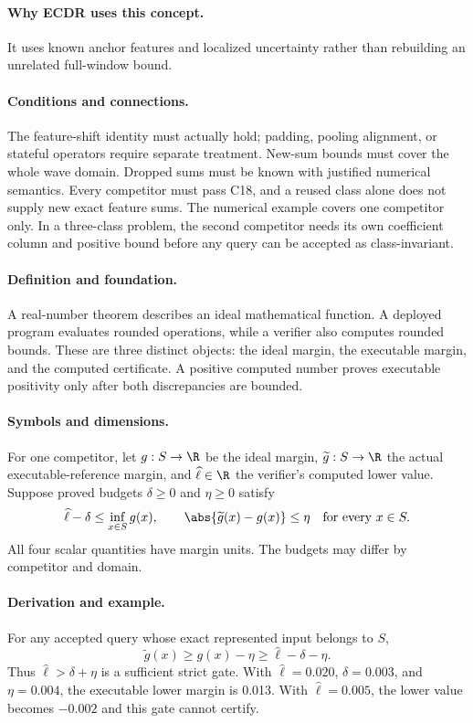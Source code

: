 \paragraph{Why ECDR uses this concept.}
It uses known anchor features and localized uncertainty rather than rebuilding an unrelated full-window bound.
\paragraph{Conditions and connections.}
The feature-shift identity must actually hold; padding, pooling alignment, or stateful operators require separate treatment. New-sum bounds must cover the whole wave domain. Dropped sums must be known with justified numerical semantics. Every competitor must pass C18, and a reused class alone does not supply new exact feature sums. The numerical example covers one competitor only. In a three-class problem, the second competitor needs its own coefficient column and positive bound before any query can be accepted as class-invariant.

\paragraph{Definition and foundation.}
A real-number theorem describes an ideal mathematical function. A deployed program evaluates rounded operations, while a verifier also computes rounded bounds. These are three distinct objects: the ideal margin, the executable margin, and the computed certificate. A positive computed number proves executable positivity only after both discrepancies are bounded.
\paragraph{Symbols and dimensions.}
For one competitor, let $g:S\to\R$ be the ideal margin, $\widetilde g:S\to\R$ the actual executable-reference margin, and $\widehat\ell\in\R$ the verifier's computed lower value. Suppose proved budgets $\delta\ge0$ and $\eta\ge0$ satisfy
\[
 \widehat\ell-\delta\le\inf_{x\in S}g(x),\qquad
 \abs{\widetilde g(x)-g(x)}\le\eta\quad\text{for every }x\in S.
\]
All four scalar quantities have margin units. The budgets may differ by competitor and domain.
\paragraph{Derivation and example.}
For any accepted query whose exact represented input belongs to $S$,
\[
 \widetilde g(x)\ge g(x)-\eta
 \ge\widehat\ell-\delta-\eta.
\]
Thus $\widehat\ell>\delta+\eta$ is a sufficient strict gate. With $\widehat\ell=0.020$, $\delta=0.003$, and $\eta=0.004$, the executable lower margin is 0.013. With $\widehat\ell=0.005$, the lower value becomes $-0.002$ and this gate cannot certify.
